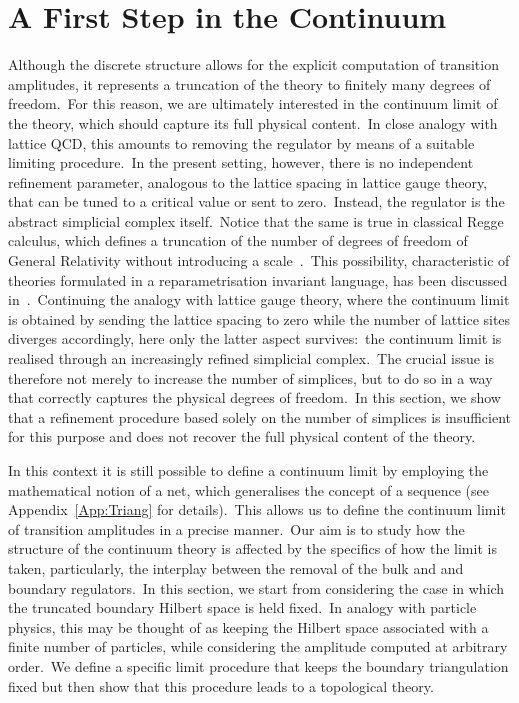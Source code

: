 \documentclass[11pt]{article}
\theoremstyle{definition}
\numberwithin{equation}{section}
\begin{document}
\section{A First Step in the Continuum}\label{Sec:Continuum1}

Although the discrete structure allows for the explicit computation of transition amplitudes, it represents a truncation of the theory to finitely many degrees of freedom.~For this reason, we are ultimately interested in the continuum limit of the theory, which should capture its full physical content.~In close analogy with lattice QCD, this amounts to removing the regulator by means of a suitable limiting procedure.~In the present setting, however, there is no independent refinement parameter, analogous to the lattice spacing in lattice gauge theory, that can be tuned to a critical value or sent to zero.~Instead, the regulator is the abstract simplicial complex itself.~Notice that the same is true in classical Regge calculus, which defines a truncation of the number of degrees of freedom of General Relativity without introducing a scale~\cite{Regge_1961}.~This possibility, characteristic of theories formulated in a reparametrisation invariant language, has been discussed in~\cite{Rovelli_2022}.~Continuing the analogy with lattice gauge theory, where the continuum limit is obtained by sending the lattice spacing to zero while the number of lattice sites diverges accordingly, here only the latter aspect survives:~the continuum limit is realised through an increasingly refined simplicial complex.~The crucial issue is therefore not merely to increase the number of simplices, but to do so in a way that correctly captures the physical degrees of freedom.~In this section, we show that a refinement procedure based solely on the number of simplices is insufficient for this purpose and does not recover the full physical content of the theory.

In this context it is still possible to define a continuum limit by employing the mathematical notion of a net, which generalises the concept of a sequence (see Appendix~\ref{App:Triang} for details).~This allows us to define the continuum limit of transition amplitudes in a precise manner.~Our aim is to study how the structure of the continuum theory is affected by the specifics of how the limit is taken, particularly, the interplay between the removal of the bulk and and boundary regulators.~In this section, we start from considering the case in which the truncated boundary Hilbert space is held fixed.~In analogy with particle physics, this may be thought of as keeping the Hilbert space associated with a finite number of particles, while considering the amplitude computed at arbitrary order.~We define a specific limit procedure that keeps the boundary triangulation fixed but then show that this procedure leads to a topological theory.
\end{document}
